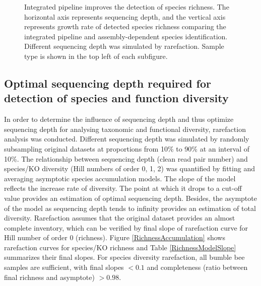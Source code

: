 \documentclass[11pt]{article}
\begin{document}
\begin{figure}[H]
\begin{subfigure}
        \end{subfigure}
        \caption{Integrated pipeline improves the detection of species richness. 
        The horizontal axis represents sequencing depth, and the vertical axis represents growth rate of detected species richness comparing the integrated pipeline and assembly-dependent species identification. 
        Different sequencing depth was simulated by rarefaction.
        Sample type is shown in the top left of each subfigure.}
        \label{CompareSensitivity}
        \end{figure}

    \subsection{Optimal sequencing depth required for detection of species and function diversity}
    In order to determine the influence of sequencing depth and thus optimize sequencing depth for 
    analysing taxonomic and functional diversity, rarefaction analysis was conducted. 
    Different sequencing depth was simulated by randomly subsampling original datasets at proportions from 10\% to 90\% at an interval of 10\%. 
    The relationship between sequencing depth (clean read pair number) and species/KO diversity (Hill numbers of order 0, 1, 2) was quantified by fitting and averaging asymptotic species accumulation models. 
    The slope of the model reflects the increase rate of diversity. 
    The point at which it drops to a cut-off value provides an estimation of optimal sequencing depth. 
    Besides, the asymptote of the model as sequencing depth tends to infinity provides an estimation of total diversity. 
    \newline
    Rarefaction assumes that the original dataset provides an almost complete inventory, which can be verified by final slope of rarefaction curve for Hill number of order 0 (richness). 
    Figure \ref{RichnessAccumulation} shows rarefaction curves for species/KO richness and Table \ref{RichnessModelSlope} summarizes their final slopes. 
    For species diversity rarefaction, all bumble bee samples are sufficient, with final slopes $< 0.1$ and completeness (ratio between final richness and asymptote) $> 0.98$. 
\end{document}
